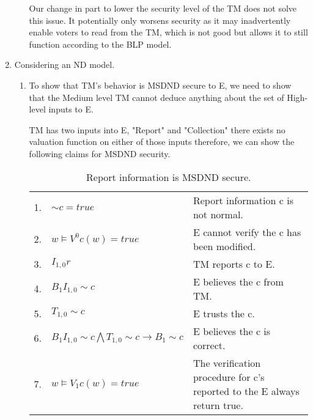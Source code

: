 \documentclass[journal,onecolumn]{IEEEtran}
\begin{document}
\begin{enumerate}
\begin{enumerate}
      Our change in part to lower the security level of the TM does not solve this issue. It potentially only worsens security as it may inadvertently enable voters to read from the TM, which is not good but allows it to still function according to the BLP model. 
    \end{enumerate}

  \item Considering an ND model. 
    \begin{enumerate}
      \item To show that TM's behavior is MSDND secure to E, we need to show that the Medium level TM cannot deduce anything about the set of High-level inputs to E.
      
      TM has two inputs into E, "Report" and "Collection" there exists no valuation function on either of those inputs therefore, we can show the following claims for MSDND security. 
      
      \begin{table}[H]
        \caption{Report information is MSDND secure.}
        \centering
        \begin{tabular}{lll}
        1.  & ${\sim} c = true$                                                     & Report information c is not normal.                                                       \\
        2.  & $w \vDash V^0 c(w) = true$                                            & E cannot verify the c has been modified.                                 \\
        3.  & $I_{1,0}r$                                                              & TM reports c to E.                                                \\
        4.  & $B_1I_{1,0} {\sim} c$                                                   & E believes the c from TM.                                     \\
        5.  & $T_{1,0} {\sim} c$                                                      & E trusts the c.                                                          \\
        6.  & $B_1I_{1,0} {\sim} c \bigwedge T_{1,0} {\sim} c \rightarrow B_1 {\sim} c$ & E believes the c is correct.                                             \\
        7. & $w \vDash V_1 c(w) = true$                                             & The verification procedure for c's reported to the E always return true.
        \end{tabular}
      \end{table}


\end{enumerate}
\end{enumerate}
\end{document}
